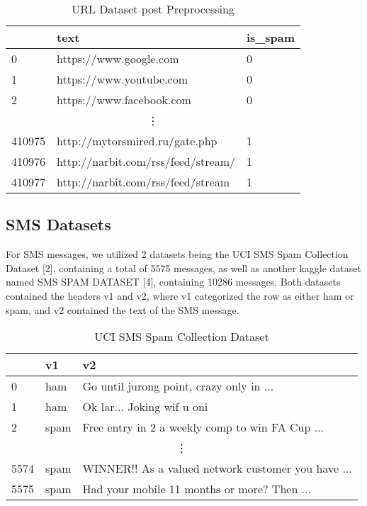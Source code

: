 \documentclass{article}
\begin{document}
\begin{table}[htbp]
    \centering
    \caption{URL Dataset post Preprocessing}
    \begin{tabular}{lll}
    \toprule
     & text & is\_spam \\
    \midrule
    0 & https://www.google.com & 0 \\
    1 & https://www.youtube.com & 0 \\
    2 & https://www.facebook.com & 0 \\
    \multicolumn{3}{c}{\vdots} \\ %
    410975 & http://mytorsmired.ru/gate.php & 1 \\
    410976 & http://narbit.com/rss/feed/stream/ & 1 \\
    410977 & http://narbit.com/rss/feed/stream & 1 \\
    \bottomrule
    \end{tabular}
    \label{tab:csv_sample}
\end{table}

\subsection*{SMS Datasets}
For SMS messages, we utilized 2 datasets being the UCI SMS Spam Collection Dataset [2], containing a total of 5575 messages, as well as another kaggle dataset named SMS SPAM DATASET [4], containing 10286 messages. Both datasets contained the headers v1 and v2, where v1 categorized the row as either ham or spam, and v2 contained the text of the SMS message.

\begin{table}[htbp]
    \centering
    \caption{UCI SMS Spam Collection Dataset}
    \begin{tabular}{lll}
    \toprule
     & v1 & v2 \\
    \midrule
    0 & ham & Go until jurong point, crazy only in ... \\
    1 & ham & Ok lar... Joking wif u oni \\
    2 & spam & Free entry in 2 a weekly comp to win FA Cup ... \\
    \multicolumn{3}{c}{\vdots} \\ %
    5574 & spam & WINNER!! As a valued network customer you have ... \\
    5575 & spam & Had your mobile 11 months or more? Then ... \\
    \bottomrule
    \end{tabular}
    \label{tab:csv_sample}
\end{table}
\end{document}
